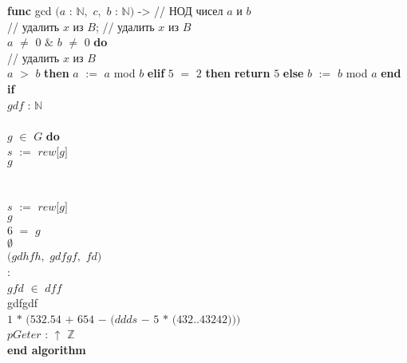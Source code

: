 \documentclass{article}
\begin{document}
{\color{blue}\textbf{func}} {\color{green}\textrm{gcd}} $($$a$ : $\mathbb{N}$$,$ $c$$,$ $b$ : $\mathbb{N}$$)$ -> // НОД чисел $a$ и $b$ \\
\tb // удалить $x$ из $B$; // удалить $x$ из $B$ \\
 $a$ $\neq$ $0$ $\&$ $b$ $\neq$ $0$ {\color{blue}\textbf{do}} \\
\tb \tb // удалить $x$ из $B$ \\
\tb {} $a$ $>$ $b$ {\color{blue}\textbf{then}}  $a$ $:=$ $a$ mod $b$  {\color{blue}\textbf{elif}} $5$ $=$ $2$ {\color{blue}\textbf{then}}  {\color{blue}\textbf{return}} $5$  {\color{blue}\textbf{else}}  $b$ $:=$ $b$ mod $a$  {\color{blue}\textbf{end if}}   \\
\tb \tb $gdf$ : $\mathbb{N}$ \\
 \\
 $g$ $\in$ $G$ {\color{blue}\textbf{do}} \\
\tb \tb $s$ $:=$ $rew$$[$$g$$]$ \\
\tb {} $g$ \\
 \\
 \\
\tb \tb $s$ $:=$ $rew$$[$$g$$]$ \\
\tb {} $g$ \\
 $6$ $=$ $g$ \\
 $\emptyset$ \\
$($$gdhfh$$,$ $gdfgf$$,$ $fd$$)$ \\
 : \\
 $gfd$ $\in$ $dff$ \\
 {\color{cyan}\textrm{gdfgdf}} \\
 $1$ $*$ $($$532.54$ $+$ $654$ $-$ $($$ddds$ $-$ $5$ $*$ $($$432$$..$$43242$$)$$)$$)$ \\
\tb $pGeter$ : $\uparrow$ $\mathbb{Z}$ \\
{\color{blue}\textbf{end algorithm}} \\
\end{document}
